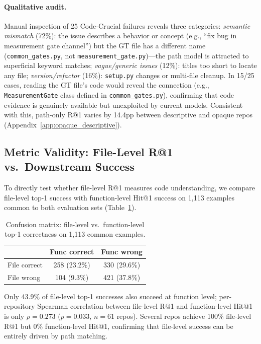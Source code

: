\documentclass{article}
\begin{document}
\paragraph{Qualitative audit.}
Manual inspection of 25 Code-Crucial failures reveals three categories: \emph{semantic mismatch} (72\%): the issue describes a behavior or concept (e.g., ``fix bug in measurement gate channel'') but the GT file has a different name (\texttt{common\_gates.py}, not \texttt{measurement\_gate.py})---the path model is attracted to superficial keyword matches; \emph{vague/generic issues} (12\%): titles too short to locate any file; \emph{version/refactor} (16\%): \texttt{setup.py} changes or multi-file cleanup.
In 15/25 cases, reading the GT file's code would reveal the connection (e.g., \texttt{MeasurementGate} class defined in \texttt{common\_gates.py}), confirming that code evidence is genuinely available but unexploited by current models.
Consistent with this, path-only R@1 varies by 14.4pp between descriptive and opaque repos (Appendix~\ref{app:opaque_descriptive}).

\subsection{Metric Validity: File-Level R@1 vs.\ Downstream Success}
\label{sec:metric_validity}

To directly test whether file-level R@1 measures code understanding, we compare file-level top-1 success with function-level Hit@1 success on 1{,}113 examples common to both evaluation sets (Table~\ref{tab:file_func_confusion}).

\begin{table}[t]
\centering
\caption{Confusion matrix: file-level vs.\ function-level top-1 correctness on 1{,}113 common examples.}
\label{tab:file_func_confusion}
\small
\begin{tabular}{lcc}
\toprule
& \textbf{Func correct} & \textbf{Func wrong} \\
\midrule
File correct & 258 (23.2\%) & 330 (29.6\%) \\
File wrong   & 104 (9.3\%)  & 421 (37.8\%) \\
\bottomrule
\end{tabular}
\end{table}

Only 43.9\% of file-level top-1 successes also succeed at function level; per-repository Spearman correlation between file-level R@1 and function-level Hit@1 is only $\rho = 0.273$ ($p = 0.033$, $n = 61$ repos).
Several repos achieve 100\% file-level R@1 but 0\% function-level Hit@1, confirming that file-level success can be entirely driven by path matching.
\end{document}
